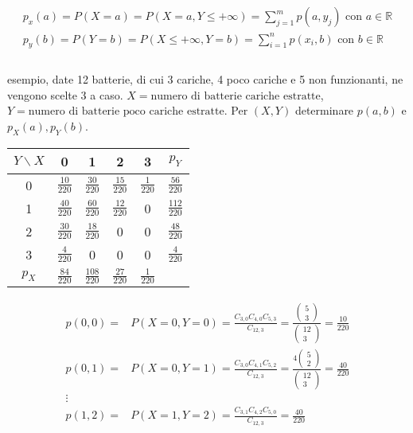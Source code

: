 \documentclass{subfiles}
\begin{document}
$$
\begin{matrix}
p_x(a) = P(X=a) = P(X=a, Y\leq+\infty) = \sum^m_{j=1} p(a, y_j) \text{ con } a \in \mathbb{R} \\
p_y(b) = P(Y=b) = P(X\leq+\infty, Y=b) = \sum^n_{i=1} p(x_i, b) \text{ con } b \in \mathbb{R} \\
\end{matrix}
$$\\

\noindent
esempio, date 12 batterie, di cui 3 cariche, 4 poco cariche e 5 non funzionanti, ne vengono scelte 3 a caso.
$X = \text{numero di batterie cariche estratte}$, $Y = \text{numero di batterie poco cariche estratte}$.
Per $(X,Y)$ determinare $p(a,b)$ e $p_X(a),p_Y(b)$.

\begin{center}
\renewcommand{\arraystretch}{2}
\begin{tabular}{ |c|c|c|c|c|c| }
\hline
$Y \backslash X$ & 0 & 1 & 2 & 3 & $p_Y$ \\
\hline
\hline
0 & $\frac{10}{220}$ & $\frac{30}{220}$ & $\frac{15}{220}$ & $\frac{1}{220}$ & $\frac{56}{220}$ \\
1 & $\frac{40}{220}$ & $\frac{60}{220}$ & $\frac{12}{220}$ & 0 & $\frac{112}{220}$ \\
2 & $\frac{30}{220}$ & $\frac{18}{220}$ & 0 & 0 & $\frac{48}{220}$ \\
3 & $\frac{4}{220}$ & 0 & 0 & 0 & $\frac{4}{220}$ \\
\hline
$p_X$ & $\frac{84}{220}$ & $\frac{108}{220}$ & $\frac{27}{220}$ & $\frac{1}{220}$ & \\
\hline
\end{tabular}
\renewcommand{\arraystretch}{1}
\end{center}

$$
\begin{matrix}
p(0,0) =& P(X=0, Y=0) = \frac{C_{3,0}C_{4,0}C_{5,3}}{C_{12,3}} = \frac{\begin{pmatrix}5\\3\end{pmatrix}}{\begin{pmatrix}12\\3\end{pmatrix}} = \frac{10}{220} \\
p(0,1) =& P(X=0, Y=1) = \frac{C_{3,0}C_{4,1}C_{5,2}}{C_{12,3}} = \frac{4\begin{pmatrix}5\\2\end{pmatrix}}{\begin{pmatrix}12\\3\end{pmatrix}} = \frac{40}{220} \\
\vdots &  \\
p(1,2) =& P(X=1, Y=2) = \frac{C_{3,1}C_{4,2}C_{5,0}}{C_{12,3}} = \frac{40}{220} \\
\end{matrix}
$$
\end{document}
